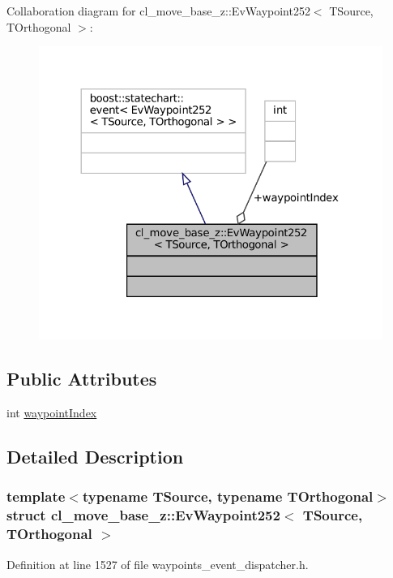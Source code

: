 Collaboration diagram for cl\+\_\+move\+\_\+base\+\_\+z\+:\+:Ev\+Waypoint252$<$ T\+Source, T\+Orthogonal $>$\+:
\nopagebreak
\begin{figure}[H]
\begin{center}
\leavevmode
\includegraphics[width=324pt]{structcl__move__base__z_1_1EvWaypoint252__coll__graph}
\end{center}
\end{figure}
\subsection*{Public Attributes}
\begin{DoxyCompactItemize}
\item 
int \hyperlink{structcl__move__base__z_1_1EvWaypoint252_a84d3bb530b93b9f30c6b6ad00df0d916}{waypoint\+Index}
\end{DoxyCompactItemize}


\subsection{Detailed Description}
\subsubsection*{template$<$typename T\+Source, typename T\+Orthogonal$>$\newline
struct cl\+\_\+move\+\_\+base\+\_\+z\+::\+Ev\+Waypoint252$<$ T\+Source, T\+Orthogonal $>$}



Definition at line 1527 of file waypoints\+\_\+event\+\_\+dispatcher.\+h.



